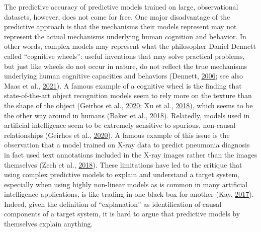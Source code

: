 \documentclass[12pt,american,a4paper,oneside,]{memoir} %
\begin{document}
The predictive accuracy of predictive models trained on large, observational datasets, however, does not come for free. One major disadvantage of the predictive approach is that the mechanisms their models represent may not represent the actual mechanisms underlying human cognition and behavior. In other words, complex models may represent what the philosopher Daniel Dennett called ``cognitive wheels'': useful inventions that may solve practical problems, but just like wheels do not occur in nature, do not reflect the true mechanisms underlying human cognitive capacities and behaviors (Dennett, \protect\hyperlink{ref-Dennett2006-el}{2006}; see also Maas et al., \protect\hyperlink{ref-Van_der_Maas2021-rx}{2021}). A famous example of a cognitive wheel is the finding that state-of-the-art object recognition models seem to rely more on the texture than the shape of the object (Geirhos et al., \protect\hyperlink{ref-Geirhos2020-af}{2020}; Xu et al., \protect\hyperlink{ref-xu2018deeper}{2018}), which seems to be the other way around in humans (Baker et al., \protect\hyperlink{ref-baker2018deep}{2018}). Relatedly, models used in artificial intelligence seem to be extremely sensitive to spurious, non-causal relationships (Geirhos et al., \protect\hyperlink{ref-Geirhos2020-af}{2020}). A famous example of this issue is the observation that a model trained on X-ray data to predict pneumonia diagnosis in fact used text annotations included in the X-ray images rather than the images themselves (Zech et al., \protect\hyperlink{ref-Zech2018-bq}{2018}). These limitations have led to the critique that using complex predictive models to explain and understand a target system, especially when using highly non-linear models as is common in many artificial intelligence applications, is like trading in one black box for another (Kay, \protect\hyperlink{ref-Kay2017-vr}{2017}). Indeed, given the definition of ``explanation'' as identification of causal components of a target system, it is hard to argue that predictive models by themselves explain anything.
\end{document}
